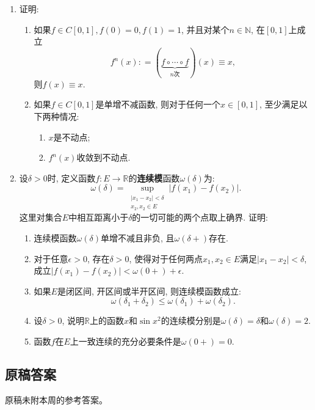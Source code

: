 \documentclass[UTF8,11pt, a4paper, oneside, fontset=none]{ctexbook}
\begin{document}
\begin{enumerate}
\item 证明:
\begin{enumerate}
\item 如果$f \in C[0, 1], f(0) = 0, f(1) = 1$, 并且对某个$n \in \mathbb N$, 在$[0, 1]$上成立
\[
f^n(x) : = (\underbrace{f \circ \cdots \circ f}_{n\text{次}}) (x) \equiv x,
\] 
则$f(x) \equiv x$.

\item 如果$f \in C[0, 1]$是单增不减函数, 则对于任何一个$x \in [0, 1]$, 至少满足以下两种情况:
\begin{enumerate}
\item[(i)] $x$是不动点;

\item[(ii)] $f^n(x)$收敛到不动点.
\end{enumerate}

\end{enumerate}

\item 设$\delta >0$时, 定义函数$f : E \to \mathbb R$的{\bf 连续模}函数$\omega(\delta)$为:
\[
\omega(\delta) = \sup_{\substack{|x_1 - x_2| <\delta \\ x_2, x_2 \in E}} |f(x_1) - f(x_2)|.
\]
这里对集合$E$中相互距离小于$\delta$的一切可能的两个点取上确界. 证明:

\begin{enumerate}
\item 连续模函数$\omega(\delta)$单增不减且非负, 且$\omega(\delta +)$存在.

\item 对于任意$\epsilon >0$, 存在$\delta >0$, 使得对于任何两点$x_1, x_2 \in E$满足$|x_1 - x_2| < \delta$, 成立$|f(x_1) - f(x_2)| < \omega(0+) + \epsilon$.

\item 如果$E$是闭区间, 开区间或半开区间, 则连续模函数成立:
\[
\omega(\delta_1 + \delta_2) \leq \omega(\delta_1) + \omega(\delta_2).
\]

\item 设$\delta>0$, 说明$\mathbb R$上的函数$x$和$\sin x^2$的连续模分别是$\omega(\delta) = \delta$和$\omega(\delta) = 2$.

\item 函数$f$在$E$上一致连续的充分必要条件是$\omega(0+) =0$.
\end{enumerate}

\end{enumerate}
\clearpage
\subsection*{原稿答案}
\noindent 原稿未附本周的参考答案。
\clearpage
\end{document}
